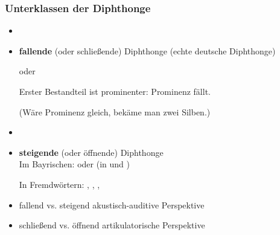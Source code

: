 \begin{frame}
\frametitle{Unterklassen der Diphthonge}
		
		\begin{itemize}
			\item[]
			\item \textbf{fallende} (oder schließende) Diphthonge (echte deutsche Diphthonge)

			\ea {} oder 
			\z

                        Erster Bestandteil ist prominenter: Prominenz fällt.

                        (Wäre Prominenz gleich, bekäme man zwei Silben.)

			\item[]
			\item \textbf{steigende} (oder öffnende) Diphthonge\\

			\ea Im Bayrischen: \textipa{[ \t{ɪa} , \t{ʊa} ]} oder  (in  und )
			\z
			
			\ea In Fremdwörtern: , , , 
			\z
			
			\item fallend vs. steigend \ras akustisch-auditive Perspektive
			\item schließend vs. öffnend \ras artikulatorische Perspektive
		\end{itemize}
		
\end{frame}



